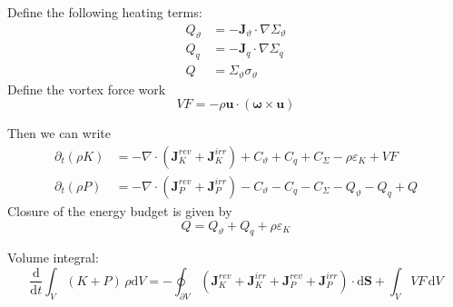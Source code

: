\documentclass{article}
\begin{document}
Define the following heating terms:
\begin{align}
    Q_\vartheta & = -\mathbf{J}_\vartheta \cdot \nabla \Sigma_\vartheta
    \\
    Q_q & = -\mathbf{J}_q \cdot \nabla \Sigma_q
    \\
    Q & = \Sigma_\vartheta \sigma_\vartheta
\end{align}
Define the vortex force work
\begin{equation}
    VF = - \rho \mathbf{u} \cdot (\boldsymbol{\omega }\times \mathbf{u})
\end{equation}

Then we can write
\begin{align}
    \partial _t (\rho K)
    & =
    - \nabla\cdot (
        \mathbf{J}_K^{rev}
        + \mathbf{J}_K^{irr}
        )
    + C_\vartheta + C_q + C_\Sigma
    - \rho \varepsilon_K
    + VF
    \\
    \partial_t (\rho P)
    & = 
    - \nabla \cdot (
        \mathbf{J}_P^{rev}
        + \mathbf{J}_P^{irr}
        )
    - C_\vartheta - C_q - C_\Sigma
    - Q_\vartheta - Q_q  + Q
\end{align}
Closure of the energy budget is given by
\begin{equation}
    Q = Q_\vartheta + Q_q + \rho \varepsilon_K
\end{equation}

Volume integral:
\begin{equation}
    \frac{\mathrm{d} }{\mathrm{d} t} \int_{V} (K + P) \, \rho \mathrm{d}V
    = - \oint_{\partial V} (
        \mathbf{J}_K^{rev} 
        + \mathbf{J}_K^{irr}
        + \mathbf{J}_P^{rev} 
        + \mathbf{J}_P^{irr}
        )\cdot \mathrm{d}\mathbf{S}
    + \int_{V} VF \, \mathrm{d}V
\end{equation}
\end{document}
